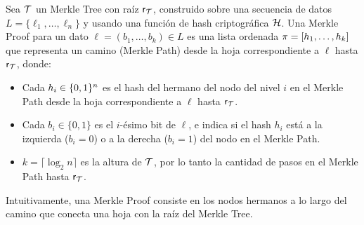\begin{definition}
\label{def:apendice-a-merkle-tree-merkle-proof}
	Sea $\mathcal{T}$ un Merkle Tree con raíz $\mathsf{r}_{\mathcal{T}}$, construido sobre una secuencia de datos $L = \{\ell_1, \ldots, \ell_n\}$ y usando una función de hash criptográfica $\mathcal{H}$. Una Merkle Proof para un dato $\ell = (b_1, \ldots, b_k) \in L$ es una lista ordenada $\pi = [h_1, \ldots, h_k]$ que representa un camino (Merkle Path) desde la hoja correspondiente a $\ell$ hasta $\mathsf{r}_{\mathcal{T}}$, donde:
	\begin{itemize}
		\item Cada $h_i \in \{0,1\}^{n}$ es el hash del hermano del nodo del nivel $i$ en el Merkle Path desde la hoja correspondiente a $\ell$ hasta $\mathsf{r}_{\mathcal{T}}$.
		\item Cada $b_i \in \{0,1\}$ es el $i$-ésimo bit de $\ell$, e indica si el hash $h_i$ está a la izquierda ($b_i = 0$) o a la derecha ($b_i = 1$) del nodo en el Merkle Path.
		\item $k = \lceil \log_2 n \rceil$ es la altura de $\mathcal{T}$, por lo tanto la cantidad de pasos en el Merkle Path hasta $\mathsf{r}_{\mathcal{T}}$.
	\end{itemize}
\end{definition}

Intuitivamente, una Merkle Proof consiste en los nodos hermanos a lo largo del camino que conecta una hoja con la raíz del Merkle Tree.

